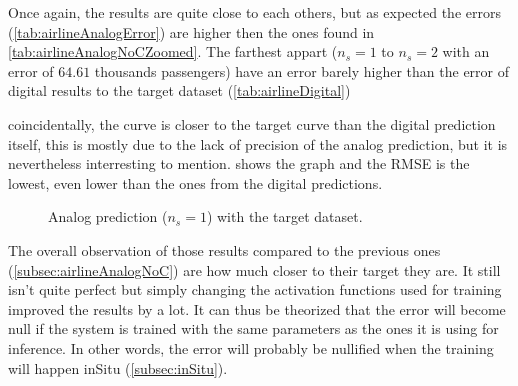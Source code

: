 Once again, the results are quite close to each others, but as expected the errors (\cref{tab:airlineAnalogError}) are higher then the ones found in \cref{tab:airlineAnalogNoCZoomed}. The farthest appart ($n_s=1$ to $n_s=2$ with an error of $64.61$ thousands passengers) have an error barely higher than the error of digital results to the target dataset (\cref{tab:airlineDigital})

coincidentally, the curve is closer to the target curve than the digital prediction itself, this is mostly due to the lack of precision of the analog prediction, but it is nevertheless interresting to mention.  shows the graph and the \ac{RMSE} is the lowest, even lower than the ones from the digital predictions.

\begin{figure}[H]
  \centering
  
  \caption{Analog prediction ($n_s=1$) with the target dataset.}
  \label{graph:airlineCoin}
\end{figure}

The overall observation of those results compared to the previous ones (\cref{subsec:airlineAnalogNoC}) are how much closer to their target they are. It still isn't quite perfect but simply changing the activation functions used for training improved the results by a lot. It can thus be theorized that the error will become null if the system is trained with the same parameters as the ones it is using for inference. In other words, the error will probably be nullified when the training will happen inSitu (\cref{subsec:inSitu}).
